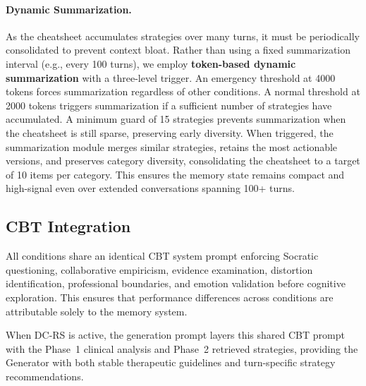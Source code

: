 \paragraph{Dynamic Summarization.}
As the cheatsheet accumulates strategies over many turns, it must be periodically consolidated to prevent context bloat. Rather than using a fixed summarization interval (e.g., every 100 turns), we employ \textbf{token-based dynamic summarization} with a three-level trigger. An emergency threshold at 4000 tokens forces summarization regardless of other conditions. A normal threshold at 2000 tokens triggers summarization if a sufficient number of strategies have accumulated. A minimum guard of 15 strategies prevents summarization when the cheatsheet is still sparse, preserving early diversity. When triggered, the summarization module merges similar strategies, retains the most actionable versions, and preserves category diversity, consolidating the cheatsheet to a target of 10 items per category. This ensures the memory state remains compact and high-signal even over extended conversations spanning 100+ turns.

\subsection{CBT Integration}

All conditions share an identical CBT system prompt enforcing Socratic questioning, collaborative empiricism, evidence examination, distortion identification, professional boundaries, and emotion validation before cognitive exploration. This ensures that performance differences across conditions are attributable solely to the memory system.

When DC-RS is active, the generation prompt layers this shared CBT prompt with the Phase~1 clinical analysis and Phase~2 retrieved strategies, providing the Generator with both stable therapeutic guidelines and turn-specific strategy recommendations.

